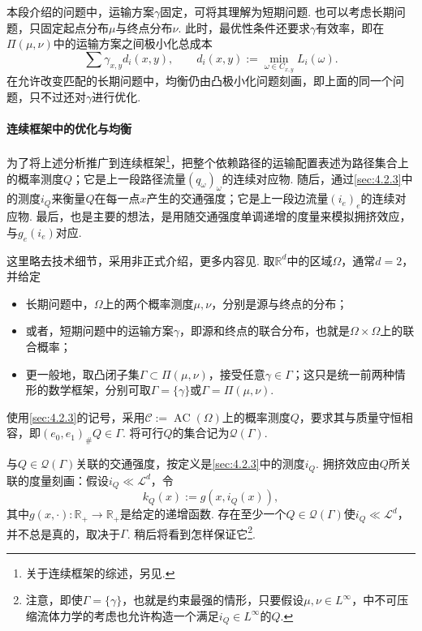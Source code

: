 \begin{remark}\label{obj:4.30}
本段介绍的问题中，运输方案$\gamma$固定，可将其理解为短期问题. 也可以考虑长期问题，只固定起点分布$\mu$与终点分布$\nu$. 此时，最优性条件还要求$\gamma$有效率，即在$\Pi(\mu,\nu)$中的运输方案之间极小化总成本
\[
\sum\gamma_{x,y}d_i(x,y),\qquad
d_i(x,y):=\min_{\omega\in C_{x,y}}L_i(\omega).
\]
在允许改变匹配的长期问题中，均衡仍由凸极小化问题刻画，即上面的同一个问题，只不过还对$\gamma$进行优化.
\end{remark}

\paragraph*{连续框架中的优化与均衡}
\label{idx:root4-p155-path-measures}为了将上述分析推广到连续框架\footnote{关于连续框架的综述，另见\cite{b111}.}，把整个依赖路径的运输配置表述为路径集合上的概率测度$Q$；它是上一段路径流量$(q_\omega)_\omega$的连续对应物. 随后，通过\autoref{sec:4.2.3}中的测度$i_Q$来衡量$Q$在每一点$x$产生的交通强度；它是上一段边流量$(i_e)_e$的连续对应物. 最后，也是主要的想法，是用随交通强度单调递增的度量来模拟拥挤效应，与$g_e(i_e)$对应.

这里略去技术细节，采用非正式介绍，更多内容见\cite{b112}. 取$\mathbb R^d$中的区域$\Omega$，通常$d=2$，并给定
\begin{itemize}
\item 长期问题中，$\Omega$上的两个概率测度$\mu,\nu$，分别是源与终点的分布；
\item 或者，短期问题中的运输方案$\gamma$，即源和终点的联合分布，也就是$\Omega\times\Omega$上的联合概率；
\item 更一般地，取凸闭子集$\Gamma\subset\Pi(\mu,\nu)$，接受任意$\gamma\in\Gamma$；这只是统一前两种情形的数学框架，分别可取$\Gamma=\{\gamma\}$或$\Gamma=\Pi(\mu,\nu)$.
\end{itemize}
使用\autoref{sec:4.2.3}的记号，采用$\mathscr C:=\operatorname{AC}(\Omega)$上的概率测度$Q$，要求其与质量守恒相容，即$(e_0,e_1)_\#Q\in\Gamma$. 将可行$Q$的集合记为$\mathscr Q(\Gamma)$.

\label{idx:root4-p155-weighted-distance}与$Q\in\mathscr Q(\Gamma)$关联的交通强度，按定义是\autoref{sec:4.2.3}中的测度$i_Q$. 拥挤效应由$Q$所关联的度量刻画：假设$i_Q\ll\mathscr L^d$，令
\[
k_Q(x):=g(x,i_Q(x)),
\]
其中$g(x,\cdot):\mathbb R_+\to\mathbb R_+$是给定的递增函数. 存在至少一个$Q\in\mathscr Q(\Gamma)$使$i_Q\ll\mathscr L^d$，并不总是真的，取决于$\Gamma$. 稍后将看到怎样保证它\footnote{注意，即使$\Gamma=\{\gamma\}$，也就是约束最强的情形，只要假设$\mu,\nu\in L^\infty$，\cite{b83}中不可压缩流体力学的考虑也允许构造一个满足$i_Q\in L^\infty$的$Q$.}.

